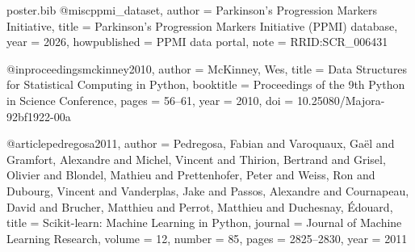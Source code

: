 
\begin{filecontents*}{poster.bib}
@misc{ppmi_dataset,
  author       = {{Parkinson's Progression Markers Initiative}},
  title        = {{Parkinson's Progression Markers Initiative (PPMI) database}},
  year         = {2026},
  howpublished = {PPMI data portal},
  note         = {RRID:SCR\_006431}
}

@inproceedings{mckinney2010,
  author    = {McKinney, Wes},
  title     = {Data Structures for Statistical Computing in {Python}},
  booktitle = {Proceedings of the 9th {Python} in Science Conference},
  pages     = {56--61},
  year      = {2010},
  doi       = {10.25080/Majora-92bf1922-00a}
}

@article{pedregosa2011,
  author  = {Pedregosa, Fabian and Varoquaux, Ga\"{e}l and Gramfort, Alexandre
             and Michel, Vincent and Thirion, Bertrand and Grisel, Olivier
             and Blondel, Mathieu and Prettenhofer, Peter and Weiss, Ron
             and Dubourg, Vincent and Vanderplas, Jake and Passos, Alexandre
             and Cournapeau, David and Brucher, Matthieu and Perrot, Matthieu
             and Duchesnay, {\'{E}douard}},
  title   = {Scikit-learn: Machine Learning in {Python}},
  journal = {Journal of Machine Learning Research},
  volume  = {12},
  number  = {85},
  pages   = {2825--2830},
  year    = {2011}
}
\end{filecontents*}

\documentclass[final]{beamer}

\usepackage[T1]{fontenc}
\usepackage[utf8]{inputenc}
\usepackage{lmodern}
\usepackage[size=custom,width=120,height=72,scale=1.0]{beamerposter}

\usepackage{graphicx}
\usepackage{tikz}
\usetikzlibrary{arrows.meta,positioning}
\usepackage[numbers]{natbib}
\usepackage{url}

\graphicspath{{figures/}{./}}


